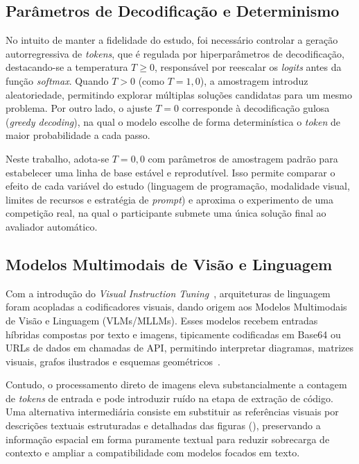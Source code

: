 \subsection{Parâmetros de Decodificação e Determinismo}\label{sec:fund-decodificacao}

No intuito de manter a fidelidade do estudo, foi necessário controlar a geração autorregressiva de \textit{tokens}, que é regulada por hiperparâmetros de decodificação, destacando-se a temperatura $T \ge 0$, responsável por reescalar os \textit{logits} antes da função \textit{softmax}. Quando $T > 0$ (como $T = 1{,}0$), a amostragem introduz aleatoriedade, permitindo explorar múltiplas soluções candidatas para um mesmo problema. Por outro lado, o ajuste $T = 0$ corresponde à decodificação gulosa (\textit{greedy decoding}), na qual o modelo escolhe de forma determinística o \textit{token} de maior probabilidade a cada passo.

Neste trabalho, adota-se $T = 0{,}0$ com parâmetros de amostragem padrão para estabelecer uma linha de base estável e reprodutível. Isso permite comparar o efeito de cada variável do estudo (linguagem de programação, modalidade visual, limites de recursos e estratégia de \textit{prompt}) e aproxima o experimento de uma competição real, na qual o participante submete uma única solução final ao avaliador automático.

\subsection{Modelos Multimodais de Visão e Linguagem}\label{sec:fund-multimodal}

Com a introdução do \textit{Visual Instruction Tuning}~\citep{Liu2023VisualIT}, arquiteturas de linguagem foram acopladas a codificadores visuais, dando origem aos Modelos Multimodais de Visão e Linguagem (VLMs/MLLMs). Esses modelos recebem entradas híbridas compostas por texto e imagens, tipicamente codificadas em Base64 ou URLs de dados em chamadas de API, permitindo interpretar diagramas, matrizes visuais, grafos ilustrados e esquemas geométricos~\citep{Fu2023MMEAC,Lu2023MathVistaEM}.

Contudo, o processamento direto de imagens eleva substancialmente a contagem de \textit{tokens} de entrada e pode introduzir ruído na etapa de extração de código. Uma alternativa intermediária consiste em substituir as referências visuais por descrições textuais estruturadas e detalhadas das figuras (), preservando a informação espacial em forma puramente textual para reduzir sobrecarga de contexto e ampliar a compatibilidade com modelos focados em texto.

